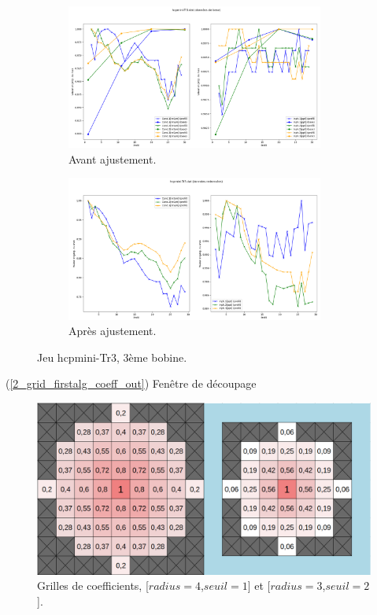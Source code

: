 \documentclass[12pt]{article}
\begin{document}
    \begin{figure}[ht!]
        \centering
        \begin{subfigure}[b]{\textwidth}
            \centering
            \includegraphics[width=0.93\textwidth]{Images/Base_Avant_Tr3.png}
            \caption[]%
            {{ \small Avant ajustement.}}    
        \end{subfigure}
        \centering
        \begin{subfigure}[b]{\textwidth}  
            \centering 
            \includegraphics[width=0.93\textwidth]{Images/Base_Apres_Tr3.png}
            \caption[]%
            {{\small Après ajustement.}}    
        \end{subfigure}
        \caption{Jeu hcpmini-Tr3, 3ème bobine.}
    \end{figure}

\newpage
    \label{2_grid_firstalg_coeff_in} (\ref{2_grid_firstalg_coeff_out}) Fenêtre de découpage

    \begin{figure}[ht!]
        \centering
        \includegraphics[width=\textwidth]{Images/Grid_FirstAlg_Coeff.png}  
        \caption{Grilles de coefficients, [$radius=4$,$seuil=1$] et [$radius=3$,$seuil=2$].}
    \end{figure}
\end{document}
